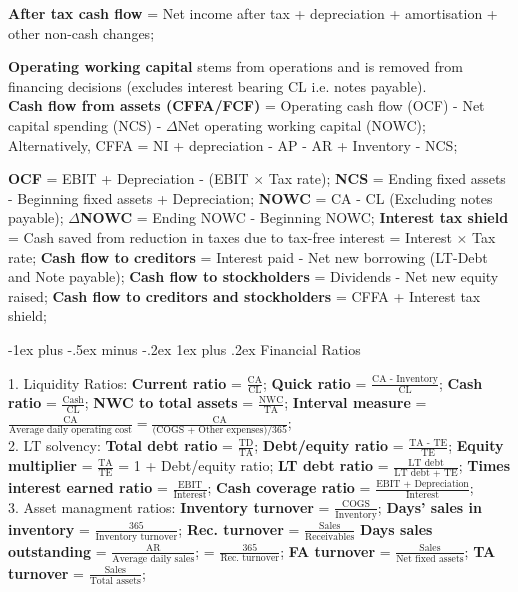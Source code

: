 \documentclass[10pt,landscape]{article}
\makeatletter
\renewcommand{\subsubsection}{\@startsection{subsubsection}{3}{0mm}%
                                {-1ex plus -.5ex minus -.2ex}%
                                {1ex plus .2ex}%
                                {\normalfont\small\bfseries}}
\makeatother
\begin{document}
\begin{multicols}{3}
\textbf{After tax cash flow} = Net income after tax + depreciation +
amortisation + other non-cash changes;

\textbf{Operating working capital} stems from operations and is removed
from financing decisions (excludes interest bearing CL i.e. notes payable). \\

\textbf{Cash flow from assets (CFFA/FCF)} = Operating cash flow (OCF)
- Net capital spending (NCS) - $\Delta$Net operating working capital
(NOWC);
Alternatively, CFFA = NI + depreciation - AP - AR + Inventory - NCS;

\textbf{OCF} = EBIT + Depreciation - (EBIT $\times$ Tax rate);
\textbf{NCS} = Ending fixed assets - Beginning fixed assets + Depreciation;
\textbf{NOWC} = CA - CL (Excluding notes payable);
$\Delta$\textbf{NOWC} = Ending NOWC - Beginning NOWC;
\textbf{Interest tax shield} = Cash saved from reduction in taxes due to
tax-free interest = Interest $\times$ Tax rate;
\textbf{Cash flow to creditors} = Interest paid - Net new borrowing (LT-Debt
and Note payable);
\textbf{Cash flow to stockholders} = Dividends - Net new equity raised;
\textbf{Cash flow to creditors and stockholders} = CFFA + Interest tax shield;

\subsubsection{Financial Ratios}

1. Liquidity Ratios: 
\textbf{Current ratio} = $\frac{\text{CA}}{\text{CL}}$;
\textbf{Quick ratio} = $\frac{\text{CA - Inventory}}{\text{CL}}$;
\textbf{Cash ratio} = $\frac{\text{Cash}}{\text{CL}}$;
\textbf{NWC to total assets} = $\frac{\text{NWC}}{\text{TA}}$;
\textbf{Interval measure} = $\frac{\text{CA}}{\text{Average daily operating cost}} =
\frac{\text{CA}}{\text{(COGS + Other expenses)/365}}$;
\\

2. LT solvency: 
\textbf{Total debt ratio} = $\frac{\text{TD}}{\text{TA}}$;
\textbf{Debt/equity ratio} = $\frac{\text{TA - TE}}{\text{TE}}$;
\textbf{Equity multiplier} = $\frac{\text{TA}}{\text{TE}}$
= 1 + Debt/equity ratio;
\textbf{LT debt ratio} = $\frac{\text{LT debt}}{\text{LT debt + TE}}$;
\textbf{Times interest earned ratio} = $\frac{\text{EBIT}}{\text{Interest}}$;
\textbf{Cash coverage ratio} = $\frac{\text{EBIT + Depreciation}}
{\text{Interest}}$;
\\

3. Asset managment ratios: 
\textbf{Inventory turnover} = $\frac{\text{COGS}}{\text{Inventory}}$;
\textbf{Days' sales in inventory} = $\frac{\text{365}}{\text{Inventory turnover}}$;
\textbf{Rec. turnover} = $\frac{\text{Sales}}{\text{Receivables}}$
\textbf{Days sales outstanding} = $\frac{\text{AR}}{\text{Average daily sales}}$;
= $\frac{\text{365}}{\text{Rec. turnover}}$;
\textbf{FA turnover} = $\frac{\text{Sales}}{\text{Net fixed assets}}$;
\textbf{TA turnover} = $\frac{\text{Sales}}{\text{Total assets}}$;
\\


\end{multicols}
\end{document}

